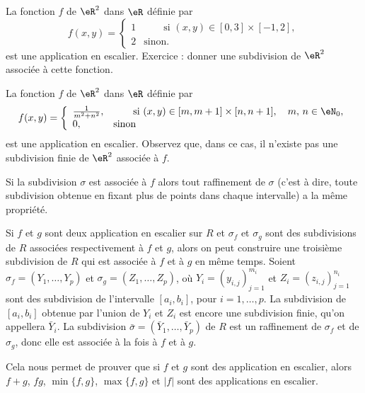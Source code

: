 \begin{example}
  La fonction $f$ de $\eR^2$ dans  $\eR$ définie par 
  \begin{equation}
    f(x,y)=\left\{
    \begin{array}{ll}
      1&\qquad \textrm{si } (x,y) \in [0,3]\times[-1,2],\\
2 &\textrm{sinon.} 
    \end{array}\right.
  \end{equation}
est une application en escalier. Exercice : donner une subdivision de $\eR^2$ associée à cette fonction.
\end{example}
\begin{example}
  La fonction $f$ de $\eR^2$ dans  $\eR$ définie par 
  \begin{equation}
    f(x,y)=\left\{
    \begin{array}{ll}
      \frac{1}{m^2+n^2},&\qquad \textrm{si } (x,y) \in [m,m+1]\times[n,n+1], \quad m,\,n\in\eN_0,\\
0, &\textrm{sinon} 
    \end{array}\right.
  \end{equation}
est une application en escalier.  Observez que, dans ce cas, il n'existe pas une subdivision finie de $\eR^2$ associée à $f$. 
\end{example}
\begin{remark}
 Si la subdivision $\sigma$ est associée à $f$ alors tout raffinement de $\sigma$ (c'est à dire, toute subdivision obtenue en fixant plus de points dans chaque intervalle) a la même propriété. 

Si $f$ et $g$ sont deux application en escalier sur $R$ et $\sigma_f$ et $\sigma_g$ sont des subdivisions de $R$ associées respectivement à $f$ et $g$, alors on peut construire une troisième subdivision de $R$ qui est associée à $f$ et à $g$ en même temps. Soient $\sigma_f=(Y_{1},\ldots, Y_{p})$ et $\sigma_g=(Z_{1},\ldots, Z_{p})$, où  $Y_{i}=(y_{i,j})_{j=1}^{m_i}$ et $Z_{i}=(z_{i,j})_{j=1}^{n_i}$ sont des subdivision de l'intervalle $[a_i, b_i]$, pour $i=1,\ldots, p$. La subdivision de $[a_i, b_i]$ obtenue par l'union de $Y_i$ et $Z_i$ est encore une subdivision finie, qu'on appellera $\bar Y_i$. La subdivision $\bar \sigma = (\bar Y_{1},\ldots,\bar Y_{p})$ de $R$ est un raffinement de $\sigma_f $ et de $\sigma_g$, donc elle est associée à la fois à $f$ et à $g$. 

Cela nous permet de prouver que si $f$ et $g$ sont des application en escalier, alors $f+g$, $fg$, $\min\{f,g\}$, $\max\{f,g\}$ et $|f|$ sont des applications en escalier. 
\end{remark}

